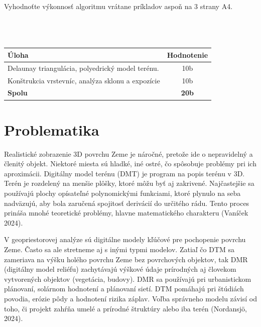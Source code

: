 \documentclass[12pt]{article}
\begin{document}
Vyhodnoťte výkonnosť algoritmu vrátane príkladov aspoň na 3 strany A4. \\\\\\\\
\begin{table}[htbp]
    \centering  
    \footnotesize
    \begin{tabular}{m{12cm}c}
        \toprule 
        \bfseries Úloha & \bfseries Hodnotenie \\ 
        \midrule 
        Delaunay triangulácia, polyedrický model terénu.& 10b \\
        Konštrukcia vrstevníc, analýza sklonu a expozície& 10b \\
        \bottomrule 
        \bfseries Spolu & \bfseries 20b
    \end{tabular}
\end{table}
\newpage
\section*{Problematika}
Realistické zobrazenie 3D povrchu Zeme je náročné, pretože ide o nepravidelný a členitý objekt. Niektoré miesta sú hladké, iné ostré, čo spôsobuje problémy pri ich aproximácii. Digitálny model terénu (DMT) je program na popis terénu v 3D. Terén je rozdelený na menšie plôšky, ktoré môžu byť aj zakrivené. Najčastejšie sa používajú plochy opísateľné polynomickými funkciami, ktoré plynulo na seba nadväzujú, aby bola zaručená spojitosť derivácií do určitého rádu. Tento proces prináša mnohé teoretické problémy, hlavne matematického charakteru (Vaníček 2024).\par

 V geopriestorovej analýze sú digitálne modely kľúčové pre pochopenie povrchu Zeme. Často sa ale stretneme aj s inými typmi modelov. Zatiaľ čo DTM sa zameriava na výšku holého povrchu Zeme bez povrchových objektov, tak DMR (digitálny model reliéfu) zachytávajú výškové údaje prírodných aj človekom vytvorených objektov (vegetácia, budovy). DMR sa používajú pri urbanistickom plánovaní, solárnom hodnotení a plánovaní sietí. DTM pomáhajú pri štúdiách povodia, erózie pôdy a hodnotení rizika záplav. Voľba správneho modelu závisí od toho, či projekt zahŕňa umelé a prírodné štruktúry alebo iba terén (Nordansjö, 2024).
\end{document}
